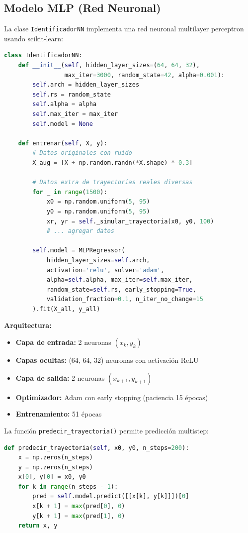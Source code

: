 \documentclass[10pt,twocolumn]{article}
\begin{document}
\subsection{Modelo MLP (Red Neuronal)}

La clase \texttt{IdentificadorNN} implementa una red neuronal multilayer perceptron usando scikit-learn:

\begin{lstlisting}[language=Python]
class IdentificadorNN:
    def __init__(self, hidden_layer_sizes=(64, 64, 32), 
                 max_iter=3000, random_state=42, alpha=0.001):
        self.arch = hidden_layer_sizes
        self.rs = random_state
        self.alpha = alpha
        self.max_iter = max_iter
        self.model = None

    def entrenar(self, X, y):
        # Datos originales con ruido
        X_aug = [X + np.random.randn(*X.shape) * 0.3]
        
        # Datos extra de trayectorias reales diversas
        for _ in range(1500):
            x0 = np.random.uniform(5, 95)
            y0 = np.random.uniform(5, 95)
            xr, yr = self._simular_trayectoria(x0, y0, 100)
            # ... agregar datos
        
        self.model = MLPRegressor(
            hidden_layer_sizes=self.arch,
            activation='relu', solver='adam',
            alpha=self.alpha, max_iter=self.max_iter,
            random_state=self.rs, early_stopping=True,
            validation_fraction=0.1, n_iter_no_change=15
        ).fit(X_all, y_all)
\end{lstlisting}

\textbf{Arquitectura:}
\begin{itemize}
    \item \textbf{Capa de entrada:} 2 neuronas $(x_k, y_k)$
    \item \textbf{Capas ocultas:} (64, 64, 32) neuronas con activación ReLU
    \item \textbf{Capa de salida:} 2 neuronas $(x_{k+1}, y_{k+1})$
    \item \textbf{Optimizador:} Adam con early stopping (paciencia 15 épocas)
    \item \textbf{Entrenamiento:} 51 épocas
\end{itemize}

La función \texttt{predecir\_trayectoria()} permite predicción multistep:

\begin{lstlisting}[language=Python]
def predecir_trayectoria(self, x0, y0, n_steps=200):
    x = np.zeros(n_steps)
    y = np.zeros(n_steps)
    x[0], y[0] = x0, y0
    for k in range(n_steps - 1):
        pred = self.model.predict([[x[k], y[k]]])[0]
        x[k + 1] = max(pred[0], 0)
        y[k + 1] = max(pred[1], 0)
    return x, y
\end{lstlisting}
\end{document}
